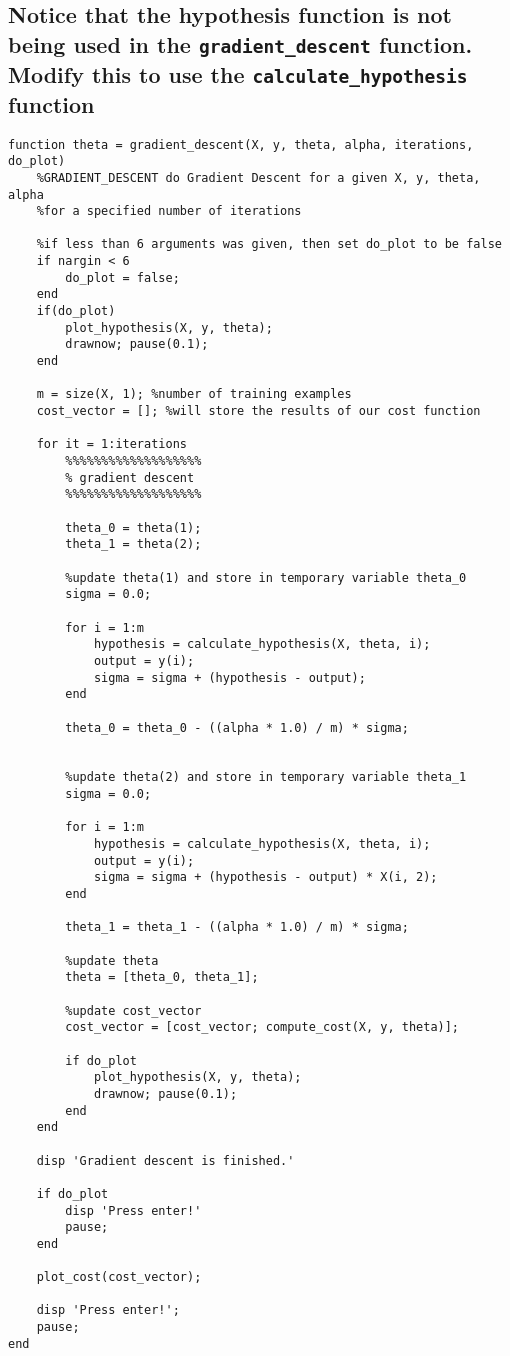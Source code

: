 \documentclass[titlepage]{scrartcl}
\newcommand{\code}[1]{\texttt{#1}}
\begin{document}
\subsection{Notice that the hypothesis function is not being used in the
\code{gradient\_descent} function. Modify this to use the
\code{calculate\_hypothesis} function}
\begin{lstlisting}
function theta = gradient_descent(X, y, theta, alpha, iterations, do_plot)
    %GRADIENT_DESCENT do Gradient Descent for a given X, y, theta, alpha
    %for a specified number of iterations

    %if less than 6 arguments was given, then set do_plot to be false
    if nargin < 6
        do_plot = false;
    end
    if(do_plot)
        plot_hypothesis(X, y, theta);
        drawnow; pause(0.1); 
    end

    m = size(X, 1); %number of training examples
    cost_vector = []; %will store the results of our cost function

    for it = 1:iterations
        %%%%%%%%%%%%%%%%%%%
        % gradient descent
        %%%%%%%%%%%%%%%%%%%

        theta_0 = theta(1);
        theta_1 = theta(2);

        %update theta(1) and store in temporary variable theta_0
        sigma = 0.0;

        for i = 1:m
            hypothesis = calculate_hypothesis(X, theta, i);
            output = y(i);
            sigma = sigma + (hypothesis - output);
        end

        theta_0 = theta_0 - ((alpha * 1.0) / m) * sigma;


        %update theta(2) and store in temporary variable theta_1
        sigma = 0.0;

        for i = 1:m
            hypothesis = calculate_hypothesis(X, theta, i);
            output = y(i);
            sigma = sigma + (hypothesis - output) * X(i, 2);
        end

        theta_1 = theta_1 - ((alpha * 1.0) / m) * sigma;

        %update theta
        theta = [theta_0, theta_1];

        %update cost_vector
        cost_vector = [cost_vector; compute_cost(X, y, theta)];

        if do_plot
            plot_hypothesis(X, y, theta);
            drawnow; pause(0.1); 
        end
    end

    disp 'Gradient descent is finished.'
        
    if do_plot
        disp 'Press enter!'
        pause;
    end

    plot_cost(cost_vector);
        
    disp 'Press enter!';
    pause;
end
\end{lstlisting}
 
\end{document}
